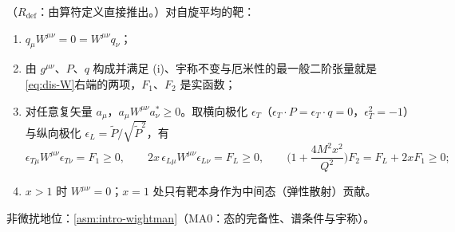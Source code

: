 \begin{proposition}\label{prop:dis-W-structure}
（$R_{\mathrm{def}}$：由算符定义直接推出。）对自旋平均的靶：
\begin{enumerate}[label=(\roman*),leftmargin=2.2em,itemsep=0pt,topsep=2pt]
\item $q_\mu W^{\mu\nu}=0=W^{\mu\nu}q_\nu$；
\item 由 $g^{\mu\nu}$、$P$、$q$ 构成并满足 (i)、宇称不变与厄米性的最一般二阶张量就是\cref{eq:dis-W}右端的两项，$F_1$、$F_2$ 是实函数；
\item 对任意复矢量 $a_\mu$，$a_\mu W^{\mu\nu}a^*_\nu\ge0$。取横向极化 $\epsilon_T$（$\epsilon_T\cdot P=\epsilon_T\cdot q=0$，$\epsilon_T^2=-1$）与纵向极化 $\epsilon_L=\tilde P/\sqrt{\tilde P^2}$，有
\begin{equation}\label{eq:dis-positivity}
\epsilon_{T\mu}W^{\mu\nu}\epsilon_{T\nu}=F_1\ge0,\qquad 2x\,\epsilon_{L\mu}W^{\mu\nu}\epsilon_{L\nu}=F_L\ge0,\qquad \Big(1+\frac{4M^2x^2}{Q^2}\Big)F_2=F_L+2xF_1\ge0 ;
\end{equation}
\item $x>1$ 时 $W^{\mu\nu}=0$；$x=1$ 处只有靶本身作为中间态（弹性散射）贡献。
\end{enumerate}
非微扰地位：\cref{asm:intro-wightman}（MA0：态的完备性、谱条件与宇称）。
\end{proposition}

